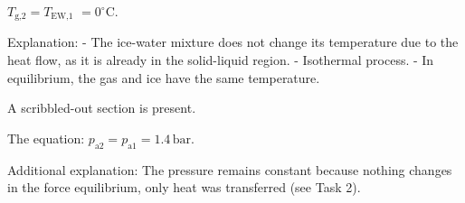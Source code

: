 \( T_{\text{g,2}} = T_{\text{EW,1}} \)  
\( = 0^\circ \text{C} \).  

Explanation:  
- The ice-water mixture does not change its temperature due to the heat flow, as it is already in the solid-liquid region.  
- Isothermal process.  
- In equilibrium, the gas and ice have the same temperature.  

A scribbled-out section is present.  

The equation:  
\( p_{\text{a2}} = p_{\text{a1}} = 1.4 \, \text{bar} \).  

Additional explanation:  
The pressure remains constant because nothing changes in the force equilibrium, only heat was transferred (see Task 2).